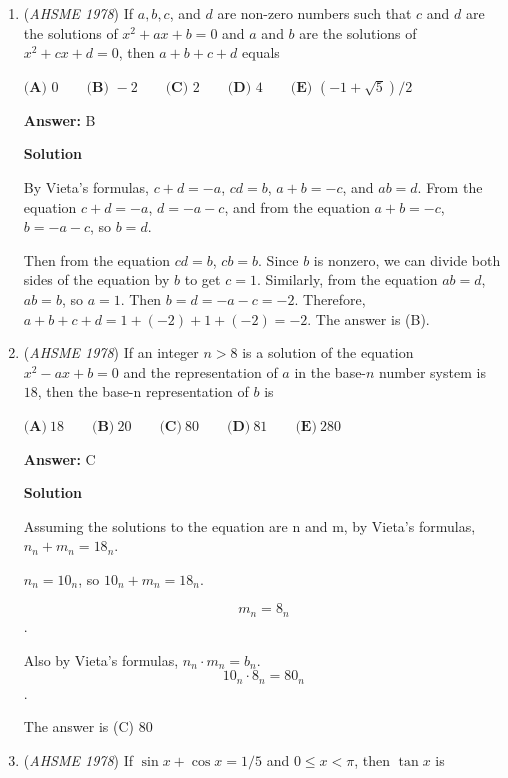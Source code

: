 \begin{enumerate}
 $\textbf{(A) }5^\circ\qquad \textbf{(B) }6^\circ\qquad \textbf{(C) }7.5^\circ\qquad \textbf{(D) }8^\circ\qquad \textbf{(E) }10^\circ$

 \textbf{Answer: }E


	\item (\textit{AHSME 1978}) If $a,b,c$, and $d$ are non-zero numbers such that $c$ and $d$ are the solutions of $x^2+ax+b=0$ and $a$ and $b$ are 
the solutions of $x^2+cx+d=0$, then $a+b+c+d$ equals


 $\textbf{(A) }0\qquad \textbf{(B) }-2\qquad \textbf{(C) }2\qquad \textbf{(D) }4\qquad  \textbf{(E) }(-1+\sqrt{5})/2$

 \textbf{Answer: }B



\textbf{Solution}

By Vieta's formulas, $c + d = -a$, $cd = b$, $a + b = -c$, and $ab = d$. From the equation $c + d = -a$, $d = -a - c$, and from the equation $a + b = -c$, $b = -a - c$, so $b = d$.

 Then from the equation $cd = b$, $cb = b$. Since $b$ is nonzero, we can divide both sides of the equation by $b$ to get $c = 1$. Similarly, from the equation $ab = d$, $ab = b$, so $a = 1$. Then $b = d = -a - c = -2$. Therefore, $a + b + c + d = 1 + (-2) + 1 + (-2) = \boxed{-2}$. The answer is (B).

 


	\item (\textit{AHSME 1978}) If an integer $n > 8$ is a solution of the equation $x^2 - ax+b=0$ and the representation of $a$ in the base-$n$ number system is $18$, 
then the base-n representation of $b$ is


 $\textbf{(A)}\ 18 \qquad \textbf{(B)}\ 20 \qquad \textbf{(C)}\ 80 \qquad \textbf{(D)}\ 81 \qquad \textbf{(E)}\ 280$

 \textbf{Answer: }C



\textbf{Solution}

Assuming the solutions to the equation are n and m, by Vieta's formulas, $n_n + m_n = 18_n$.  

 $n_n = 10_n$, so $10_n + m_n = 18_n$.  

 
 \[m_n = 8_n\].

 Also by Vieta's formulas, $n_n \cdot m_n = b_n$. 
 \[10_n \cdot 8_n = \boxed{80_n}\].

 The answer is (C) $80$



	\item (\textit{AHSME 1978}) If $\sin x+\cos x=1/5$ and $0\le x<\pi$, then $\tan x$ is



\end{enumerate}
